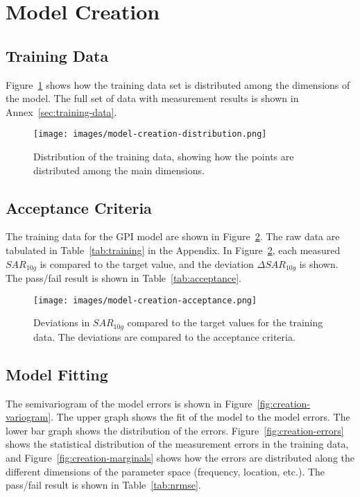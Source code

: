 \documentclass{article}
\begin{document}
\section{Model Creation}



\FloatBarrier
\subsection{Training Data}

Figure~\ref{fig:training-dist} shows how the training data set is distributed among the dimensions of the model. The full set of data with measurement results is shown in Annex~\ref{sec:training-data}.

\begin{figure} \centering
\texttt{[image: images/model-creation-distribution.png]}
\caption{Distribution of the training data, showing how the points are distributed among the main dimensions.} \label{fig:training-dist}
\end{figure}

\FloatBarrier
\subsection{Acceptance Criteria}
The training data for the GPI model are shown in Figure~\ref{fig:creation-acc}. The raw data are tabulated in Table~\ref{tab:training} in the Appendix.
In Figure~\ref{fig:creation-acc}, each measured $SAR_{10g}$ is compared to the target value, and the deviation $\Delta SAR_{10g}$ is shown. The pass/fail result is shown in Table~\ref{tab:acceptance}.



\begin{figure}[H] \centering
\texttt{[image: images/model-creation-acceptance.png]}
\caption{Deviations in $SAR_{10g}$ compared to the target values for the training data. The deviations are compared to the acceptance criteria.} \label{fig:creation-acc}
\end{figure}

\FloatBarrier
\subsection{Model Fitting}
The semivariogram of the model errors is shown in Figure~\ref{fig:creation-variogram}. The upper graph shows the fit of the model to the model errors. The lower bar graph shows the distribution of the errors. Figure~\ref{fig:creation-errors} shows the statistical distribution of the measurement errors in the training data, and Figure~\ref{fig:creation-marginals} shows how the errors are distributed along the different dimensions of the parameter space (frequency, location, etc.). The pass/fail result is shown in Table~\ref{tab:nrmse}.
\end{document}
